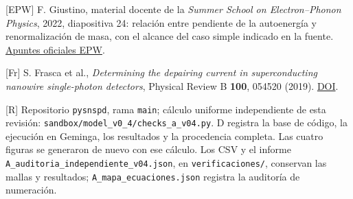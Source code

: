 \documentclass[
  spanish,
  10pt,
  a4paper,
]{article}
\begin{document}
{[}EPW{]} F. Giustino, material docente de la \emph{Summer School on
Electron--Phonon Physics}, 2022, diapositiva 24: relación entre
pendiente de la autoenergía y renormalización de masa, con el alcance
del caso simple indicado en la fuente.
\href{https://docs.epw-code.org/_downloads/720916b4aba43b13d75d323126c36a0c/Tue.2.Giustino.pdf}{Apuntes
oficiales EPW}.

{[}Fr{]} S. Frasca et al., \emph{Determining the depairing current in
superconducting nanowire single-photon detectors}, Physical Review B
\textbf{100}, 054520 (2019).
\href{https://doi.org/10.1103/PhysRevB.100.054520}{DOI}.

{[}R{]} Repositorio \nolinkurl{pysnspd}, rama \nolinkurl{main}; cálculo
uniforme independiente de esta revisión:
\nolinkurl{sandbox/model_v0_4/checks_a_v04.py}. D registra la base de
código, la ejecución en Geminga, los resultados y la procedencia
completa. Las cuatro figuras se generaron de nuevo con ese cálculo. Los
CSV y el informe \nolinkurl{A_auditoria_independiente_v04.json}, en
\nolinkurl{verificaciones/}, conservan las mallas y resultados;
\nolinkurl{A_mapa_ecuaciones.json} registra la auditoría de numeración.
\end{document}
